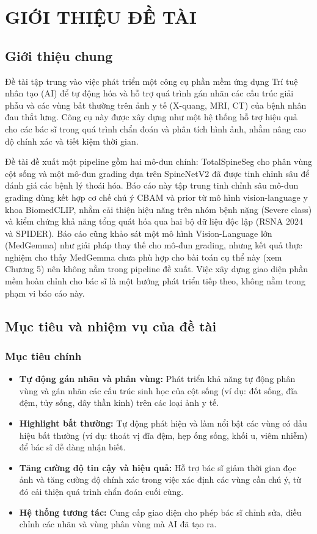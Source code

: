 \chapter{GIỚI THIỆU ĐỀ TÀI}

\section{Giới thiệu chung}
Đề tài  tập trung vào việc phát triển một công cụ phần mềm ứng dụng Trí tuệ nhân tạo (AI) để tự động hóa và hỗ trợ quá trình gán nhãn các cấu trúc giải phẫu và các vùng bất thường trên ảnh y tế (X-quang, MRI, CT) của bệnh nhân đau thắt lưng. Công cụ này được xây dựng như một hệ thống hỗ trợ hiệu quả cho các bác sĩ trong quá trình chẩn đoán và phân tích hình ảnh, nhằm nâng cao độ chính xác và tiết kiệm thời gian.

Đề tài đề xuất một pipeline gồm hai mô-đun chính: TotalSpineSeg cho phân vùng cột sống và một mô-đun grading dựa trên SpineNetV2 đã được tinh chỉnh sâu để đánh giá các bệnh lý thoái hóa. Báo cáo này tập trung tinh chỉnh sâu mô-đun grading dùng kết hợp cơ chế chú ý CBAM và prior từ mô hình vision-language y khoa BiomedCLIP, nhằm cải thiện hiệu năng trên nhóm bệnh nặng (Severe class) và kiểm chứng khả năng tổng quát hóa qua hai bộ dữ liệu độc lập (RSNA 2024 và SPIDER). Báo cáo cũng khảo sát một mô hình Vision-Language lớn (MedGemma) như giải pháp thay thế cho mô-đun grading, nhưng kết quả thực nghiệm cho thấy MedGemma chưa phù hợp cho bài toán cụ thể này (xem Chương 5) nên không nằm trong pipeline đề xuất. Việc xây dựng giao diện phần mềm hoàn chỉnh cho bác sĩ là một hướng phát triển tiếp theo, không nằm trong phạm vi báo cáo này.

\section{Mục tiêu và nhiệm vụ của đề tài}
\subsection*{Mục tiêu chính}
\begin{itemize}
    \item \textbf{Tự động gán nhãn và phân vùng:} Phát triển khả năng tự động phân vùng và gán nhãn các cấu trúc sinh học của cột sống (ví dụ: đốt sống, đĩa đệm, tủy sống, dây thần kinh) trên các loại ảnh y tế.
    \item \textbf{Highlight bất thường:} Tự động phát hiện và làm nổi bật các vùng có dấu hiệu bất thường (ví dụ: thoát vị đĩa đệm, hẹp ống sống, khối u, viêm nhiễm) để bác sĩ dễ dàng nhận biết.
    \item \textbf{Tăng cường độ tin cậy và hiệu quả:} Hỗ trợ bác sĩ giảm thời gian đọc ảnh và tăng cường độ chính xác trong việc xác định các vùng cần chú ý, từ đó cải thiện quá trình chẩn đoán cuối cùng.
    \item \textbf{Hệ thống tương tác:} Cung cấp giao diện cho phép bác sĩ chỉnh sửa, điều chỉnh các nhãn và vùng phân vùng mà AI đã tạo ra.
\end{itemize}

